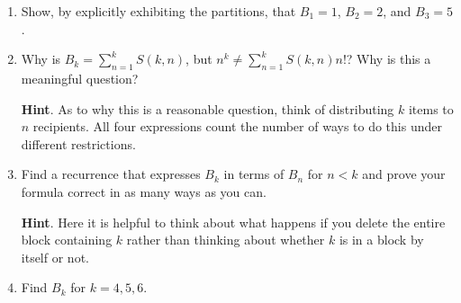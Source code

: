 \documentclass{book}
\begin{document}
\setcounter{cpjt}{206}
\addtocounter{cpjt}{-1}
\begin{activity}\label{BellNumberIntro}
\leavevmode%
\begin{enumerate}[font=\bfseries,label=(\alph*),ref=\alph*]
\item\label{task-213} \hypertarget{p-1108}{}%
Show, by explicitly exhibiting the partitions, that \(B_1 = 1\), \(B_2 = 2\), and \(B_3 = 5\).%
\par\smallskip%
\noindent\item\label{task-214} \hypertarget{p-1110}{}%
Why is \(B_k = \sum_{n=1}^{k} S(k,n)\), but \(n^k \ne \sum_{n=1}^k S(k,n)n!\)?  Why is this a meaningful question?%
\par\smallskip%
\noindent\textbf{Hint}.\hypertarget{hint-130}{}\quad%
\hypertarget{p-1111}{}%
As to why this is a reasonable question, think of distributing \(k\) items to \(n\) recipients.  All four expressions count the number of ways to do this under different restrictions.%
\item\label{task-215} \hypertarget{p-1112}{}%
Find a recurrence that expresses \(B_k\) in terms of \(B_n\) for \(n\lt  k\) and prove your formula correct in as many ways as you can.%
\par\smallskip%
\noindent\textbf{Hint}.\hypertarget{hint-131}{}\quad%
\hypertarget{p-1113}{}%
Here it is helpful to think about what happens if you delete the entire block containing \(k\) rather than thinking about whether \(k\) is in a block by itself or not.%
\par\smallskip%
\noindent\item\label{task-216} \hypertarget{p-1116}{}%
Find \(B_k\) for \(k=4,5,6\).%
\par\smallskip%
\noindent\end{enumerate}
\end{activity}

\clearpage
\end{document}
